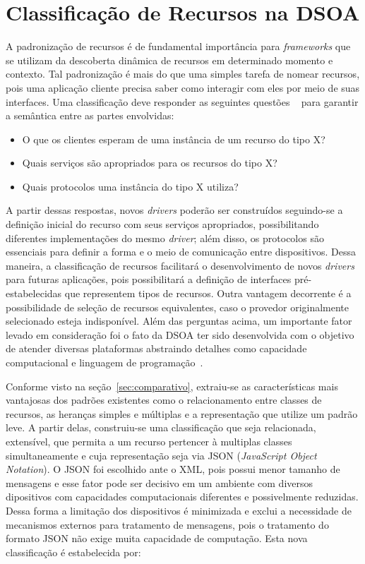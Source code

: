 \chapter{Classificação de Recursos na DSOA}

A padronização de recursos é de fundamental importância para \emph{frameworks} que se utilizam da descoberta dinâmica de recursos em determinado momento e contexto. Tal padronização é mais do que uma simples tarefa de nomear recursos, pois uma aplicação cliente precisa saber como interagir com eles por meio de suas interfaces. Uma classificação deve responder as seguintes questões ~\cite{pervasiveComputing} para garantir a semântica entre as partes envolvidas:

\begin{itemize}
	\item O que os clientes esperam de uma instância de um recurso do tipo X?

	\item Quais serviços são apropriados para os recursos do tipo X?

	\item Quais protocolos uma instância do tipo X utiliza?
\end{itemize}

A partir dessas respostas, novos \emph{drivers} poderão ser construídos seguindo-se a definição inicial do recurso com seus serviços apropriados, possibilitando diferentes implementações do mesmo \emph{driver}; além disso, os protocolos são essenciais para definir a forma e o meio de comunicação entre dispositivos. Dessa maneira, a classificação de recursos facilitará o desenvolvimento de novos \emph{drivers} para futuras aplicações, pois possibilitará a definição de interfaces pré-estabelecidas que representem tipos de recursos. Outra vantagem decorrente é a possibilidade de seleção de recursos equivalentes, caso o provedor originalmente selecionado esteja indisponível. Além das perguntas acima, um importante fator levado em consideração foi o fato da DSOA ter sido desenvolvida com o objetivo de atender diversas plataformas abstraindo detalhes como capacidade computacional e linguagem de programação~\cite{buzetoDSOA2010}.

Conforme visto na seção~\ref{sec:comparativo}, extraiu-se as características mais vantajosas dos padrões existentes como o relacionamento entre classes de recursos, as heranças simples e múltiplas e a representação que utilize um padrão leve. A partir delas, construiu-se uma classificação que seja relacionada, extensível, que permita a um recurso pertencer à multiplas classes simultaneamente e cuja representação seja via JSON (\emph{JavaScript Object Notation}). O JSON foi escolhido ante o XML, pois possui menor tamanho de mensagens e esse fator pode ser decisivo em um ambiente com diversos dipositivos com capacidades computacionais diferentes e possivelmente reduzidas. Dessa forma a limitação dos dispositivos é minimizada e exclui a necessidade de mecanismos externos para tratamento de mensagens, pois o tratamento do formato JSON não exige muita capacidade de computação. Esta nova classificação é estabelecida por:

